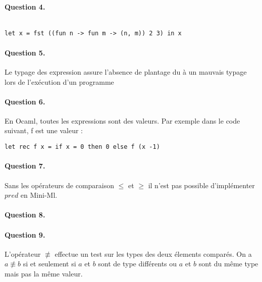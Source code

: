 \documentclass{article}
\begin{document}

\paragraph{Question 4.}

\begin{verbatim}

let x = fst ((fun n -> fun m -> (n, m)) 2 3) in x

\end{verbatim}

\paragraph{Question 5.}

Le typage des expression assure l'absence de plantage du à un mauvais typage
lors de l'exécution d'un programme

\paragraph{Question 6.}

En Ocaml, toutes les expressions sont des valeurs. Par exemple dans le code suivant, f est une valeur :
\begin{verbatim}
let rec f x = if x = 0 then 0 else f (x -1)
\end{verbatim}

\paragraph{Question 7.}

Sans les opérateurs de comparaison $\le$ et $\ge$ il n'est pas possible d'implémenter $pred$ en Mini-Ml.

\paragraph{Question 8.}



\paragraph{Question 9.}

L'opérateur $\not\equiv$ effectue un test sur les types des deux élements comparés. On a $a \not\equiv b$ si et seulement si $a$ et $b$ sont de type différents ou $a$ et $b$ sont du même type mais pas la même valeur.
\end{document}
